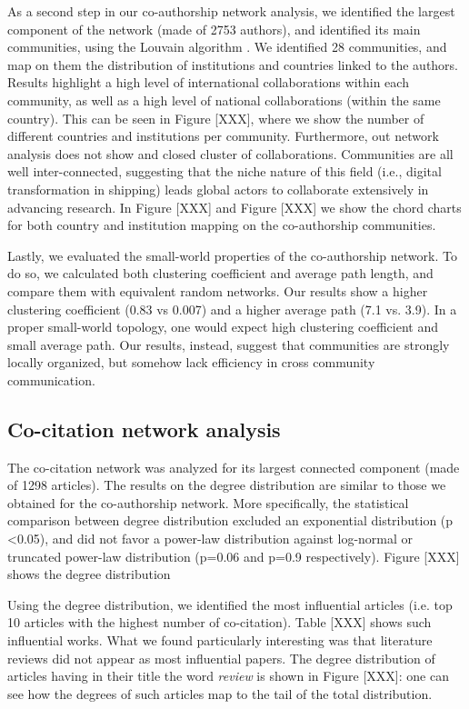 \documentclass[a4paper, review, endfloat, authoryear]{elsarticle}
\begin{document}
	As a second step in our co-authorship network analysis, we identified the largest component of the network (made of 2753 authors), and identified its main communities, using the Louvain algorithm \citep{blondel2008fast}. We identified 28 communities, and map on them the distribution of institutions and countries linked to the authors. Results highlight a high level of international collaborations within each community, as well as a high level of national collaborations (within the same country). This can be seen in Figure [XXX], where we show the number of different countries and institutions per community. Furthermore, out network analysis does not show and closed cluster of collaborations. Communities are all well inter-connected, suggesting that the niche nature of this field (i.e., digital transformation in shipping) leads global actors to collaborate extensively in advancing research. In Figure [XXX] and Figure [XXX] we show the chord charts for both country and institution mapping on the co-authorship communities.
	
	Lastly, we evaluated the small-world properties of the co-authorship network. To do so, we calculated both clustering coefficient and average path length, and compare them with equivalent random networks. Our results show a higher clustering coefficient (0.83 vs 0.007) and a higher average path (7.1 vs. 3.9). In a proper small-world topology, one would expect high clustering coefficient and small average path. Our results, instead, suggest that communities are strongly locally organized, but somehow lack efficiency in cross community communication.
	
	\subsection{Co-citation network analysis}
	The co-citation network was analyzed for its largest connected component (made of 1298 articles). The results on the degree distribution are similar to those we obtained for the co-authorship network. More specifically, the statistical comparison between degree distribution excluded an exponential distribution (p \textless 0.05), and did not favor a power-law distribution against log-normal or truncated power-law distribution (p=0.06 and p=0.9 respectively). Figure [XXX] shows the degree distribution
	
	Using the degree distribution, we identified the most influential articles (i.e. top 10 articles with the highest number of co-citation). Table [XXX] shows such influential works. What we found particularly interesting was that literature reviews did not appear as most influential papers. The degree distribution of articles having in their title the word \textit{review} is shown in Figure [XXX]: one can see how the degrees of such articles map to the tail of the total distribution.
	
\end{document}
